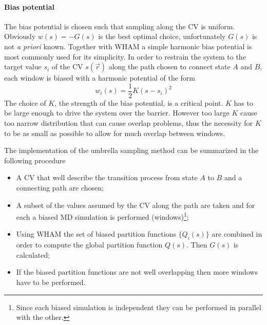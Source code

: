 \paragraph{\textbf{Bias potential}} The bias potential is chosen such that sampling along the \ac{CV} is uniform. Obviously $w(s) = -G(s)$ is the best optimal choice, unfortunately $G(s)$ is not \textit{a priori} known. Together with \ac{WHAM} a simple harmonic bias potential is most commonly used for its simplicity. In order to restrain the system to the target value $s_i$ of the \ac{CV} $s(\vec r)$ along the path chosen to connect state $A$ and $B$, each window is biased with a harmonic potential of the form
\begin{equation*}
	w_i(s) = \frac{1}{2}K (s - s_i)^2
\end{equation*}
The choice of $K$, the strength of the bias potential, is a critical point. $K$ has to be large enough to drive the system over the barrier. However too large $K$ cause too narrow distribution that can cause overlap problems, thus the necessity for $K$ to be as small as possible to allow for much overlap between windows.


\bigskip The implementation of the umbrella sampling method can be summarized in the following procedure
\begin{itemize}
	\item A \ac{CV} that well describe the transition process from state $A$ to $B$ and a connecting path are chosen;
	\item A subset of the values assumed by the \ac{CV} along the path are taken and for each a biased \ac{MD} simulation is performed (windows)\footnote{Since each biased simulation is independent they can be performed in parallel with the other.};
	\item Using \ac{WHAM} the set of biased partition functions $\{Q_i(s)\}$ are combined in order to compute the global partition function $Q(s)$. Then $G(s)$ is calculated;
	\item If the biased partition functions are not well overlapping then more windows have to be performed.
\end{itemize}

 
